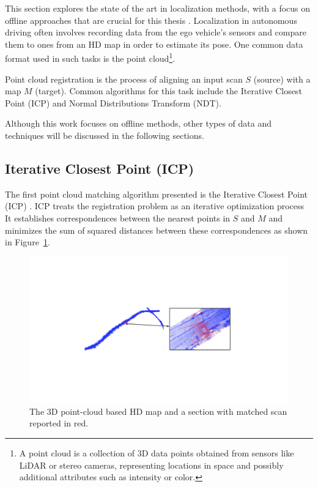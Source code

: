 This section explores the state of the art in localization methods, with a focus on offline approaches that are crucial for this thesis \cite{Liu_Wang_Zhang_2020, wijaya2024highdefinitionmapmapping}. Localization in autonomous driving often involves recording data from the ego vehicle's sensors and compare them to ones from an HD map in order to estimate its pose. One common data format used in such tasks is the point cloud\footnote{A point cloud is a collection of 3D data points obtained from sensors like LiDAR or stereo cameras, representing locations in space and possibly additional attributes such as intensity or color.}. 

Point cloud registration is the process of aligning an input scan \( S \) (source) with a map \( M \) (target). Common algorithms for this task include the Iterative Closest Point (ICP) and Normal Distributions Transform (NDT). 

Although this work focuses on offline methods, other types of data and techniques will be discussed in the following sections.

\subsection*{Iterative Closest Point (ICP)}
The first point cloud matching algorithm presented is the Iterative Closest Point (ICP) \cite{s20082166, Liu_Wang_Zhang_2020}. ICP treats the registration problem as an iterative optimization process It establishes correspondences between the nearest points in \( S \) and \( M \) and minimizes the sum of squared distances between these correspondences as shown in Figure~\ref{fig:icp_matching}. 
\begin{figure}[H]
    \centering
    \includegraphics[width=1\linewidth]{LateX//figs/icp.pdf}
    \caption{The 3D point-cloud based HD map and a section with matched scan reported in red.}
    \label{fig:icp_matching}
\end{figure}

